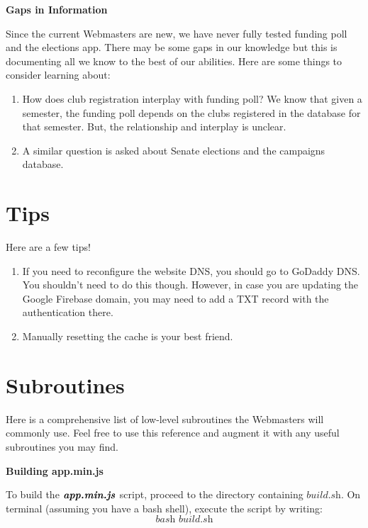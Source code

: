 \documentclass[a4paper]{article}
\begin{document}
\begin{center}
\textbf{Gaps in Information}
\end{center}

Since the current Webmasters are new, we have never fully tested funding poll and the elections app. There may be some gaps in our knowledge but this is documenting all we know to the best of our abilities. Here are some things to consider learning about:

\begin{enumerate}
  \item How does club registration interplay with funding poll? We know that given a semester, the funding poll depends on the clubs registered in the database for that semester. But, the relationship and interplay is unclear.
  \item A similar question is asked about Senate elections and the campaigns database.
\end{enumerate}

\newpage
\section{Tips}

Here are a few tips!
\begin{enumerate}
  \item If you need to reconfigure the website DNS, you should go to GoDaddy DNS. You shouldn't need to do this though. However, in case you are updating the Google Firebase domain, you may need to add a TXT record with the authentication there.
  \item Manually resetting the cache is your best friend.
\end{enumerate}

\newpage
\section{Subroutines}

Here is a comprehensive list of low-level subroutines the Webmasters will commonly use. Feel free to use this reference and augment it with any useful subroutines you may find.

\begin{center}
\textbf{Building app.min.js}
\end{center}

To build the $\textbf{\textit{app.min.js}}$ script, proceed to the directory containing $\textit{build.sh}$. On terminal (assuming you have a bash shell), execute the script by writing:
$$\textit{bash build.sh}$$
\end{document}
